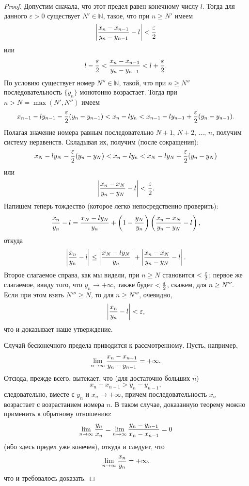 \documentclass{article}
\begin{document}
\begin{proof}
Допустим сначала, что этот предел равен конечному числу \(l\). Тогда для данного \(\varepsilon > 0\) существует \(N' \in \mathbb{N}\), такое, что при \(n \geq N'\) имеем
\[
\left|{{x_n - x_{n - 1}} \over {y_n - y_{n - 1}}} - l\right| < {\varepsilon \over 2}
\]
или
\[
l - {\varepsilon \over 2} < {{x_n - x_{n - 1}} \over {y_n - y_{n - 1}}} < l + {\varepsilon \over 2}.
\]
По условию существует номер \(N'' \in \mathbb{N}\), такой, что при \(n \geq N''\) последовательность \(\{y_n\}\) монотонно возрастает. Тогда при \(n > N = \max(N', N'')\) имеем
\[
x_{n - 1} - ly_{n - 1} - {\varepsilon \over 2}({y_n - y_{n - 1}}) < x_n - ly_n < x_{n - 1} - ly_{n - 1} + {\varepsilon \over 2}({y_n - y_{n - 1}}).
\]
Полагая значение номера равным последовательно \(N + 1\), \(N + 2\), ..., \(n\), получим систему неравенств. Складывая их, получим (после сокращения):
\[
x_{N} - ly_{N} - {\varepsilon \over 2}({y_n - y_{N}}) < x_n - ly_n < x_{N} - ly_{N} + {\varepsilon \over 2}({y_n - y_{N}})
\]
или
\[
\left|{{x_n - x_{N}} \over {y_n - y_{N}}} - l\right| < {\varepsilon \over 2}.
\]
Напишем теперь тождество (которое легко непосредственно проверить):
\[
{x_n \over y_n} - l = {{x_{N} - ly_{N}} \over y_n} + \left(1 - {y_{N} \over y_n}\right)\left({{x_n - x_{N}} \over {y_n - y_{N}}} - l\right),
\]
откуда
\[
\left|{x_n \over y_n} - l\right| \leq \left|{{x_{N} - ly_{N}} \over y_n}\right| + \left|{{x_n - x_{N}} \over {y_n - y_{N}}} - l\right|.
\]
Второе слагаемое справа, как мы видели, при \(n \geq N\) становится \(< {\varepsilon \over 2}\); первое же слагаемое, ввиду того, что \(y_n \to +\infty\), также будет \(< {\varepsilon \over 2}\), скажем, для \(n \geq N'''\). Если при этом взять \(N''' \geq N\), то для \(n \geq N'''\), очевидно,
\[
\left|{x_n \over y_n} - l\right| < \varepsilon,
\]
что и доказывает наше утверждение.

Случай бесконечного предела приводится к рассмотренному. Пусть, например,
\[
\lim\limits_{n \to \infty}{{x_n - x_{n - 1}} \over {y_n - y_{n - 1}}} = + \infty.
\]
Отсюда, прежде всего, вытекает, что (для достаточно больших \(n\))
\[
x_n - x_{n - 1} > y_n - y_{n - 1},
\]
следовательно, вместе с \(y_n\) и \(x_n \to + \infty\), причем последовательность \(x_n\) возрастает с возрастанием номера \(n\). В таком случае, доказанную теорему можно применить к обратному отношению:
\[
\lim\limits_{n \to \infty}{{y_n} \over {x_n}} = \lim\limits_{n \to \infty}{{y_n - y_{n - 1}} \over {x_n - x_{n - 1}}} = 0
\]
(ибо здесь предел уже конечен), откуда и следует, что
\[
\lim\limits_{n \to \infty}{{x_n} \over {y_n}} = + \infty,
\]
что и требовалось доказать.
\end{proof}
\end{document}
